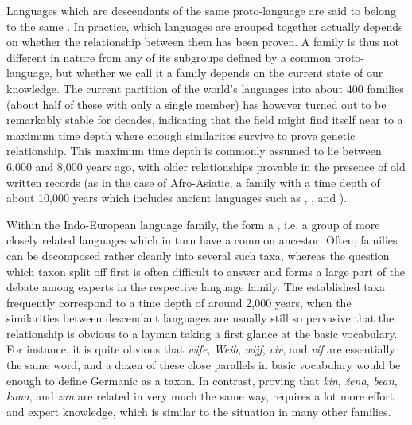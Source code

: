 Languages which are descendants of the same proto-language are said to belong to the same \textit{}. In practice, which languages are grouped together actually depends on whether the relationship between them has been proven. A family is thus not different in nature from any of its subgroups defined by a common proto-language, but whether we call it a family depends on the current state of our knowledge. The current partition of the world's languages into about 400 families (about half of these with only a single member) has however turned out to be remarkably stable for decades, indicating that the field might find itself near to a maximum time depth where enough similarites survive to prove genetic relationship. This maximum time depth is commonly assumed to lie between 6,000 and 8,000 years ago, with older relationships provable in the presence of old written records (as in the case of Afro-Asiatic, a family with a time depth of about 10,000 years which 
includes ancient languages such as , , and ).

Within the Indo-European language family, the  form a \textit{}, i.e. a group of more closely related languages which in turn have a common ancestor. Often, families can be decomposed rather cleanly into several such taxa, whereas the question which taxon split off first is often difficult to answer and forms a large part of the debate among experts in the respective language family. The established taxa frequently correspond to a time depth of around 2,000 years, when the similarities between descendant languages are usually still so pervasive that the relationship is obvious to a layman taking a first glance at the basic vocabulary. For instance, it is quite obvious that  \textit{wife},  \textit{Weib},  \textit{wijf},  \textit{viv}, and  \textit{víf} are essentially the same word, and a dozen of these close parallels in basic vocabulary would be enough to define Germanic as a taxon.
 In contrast, proving that  \textit{kin},  \textit{žena},  \textit{bean},  \textit{kona}, and  \textit{zan} are related in very much the same way, requires a lot more effort and expert knowledge, which is similar to the situation in many other families.

